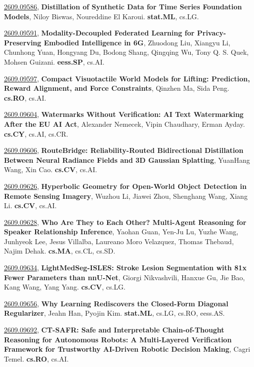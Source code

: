 \documentclass[9pt, a4paper]{article}
\theoremstyle{plain}
\theoremstyle{definition}
\theoremstyle{remark}
\newcommand{\arxivwithtarget}[3]{\hypertarget{#1}{}\href{https://arxiv.org/abs/#1}{#1}, \textbf{\textcolor{arxivblue}{#2}}, #3. }
\begin{document}
\arxivwithtarget{2609.09586}{Distillation of Synthetic Data for Time Series Foundation Models}{Niloy Biswas, Noureddine El Karoui}\textbf{stat.ML}, cs.LG.



\arxivwithtarget{2609.09591}{Modality-Decoupled Federated Learning for Privacy-Preserving Embodied Intelligence in 6G}{Zhuodong Liu, Xiangyu Li, Chunhong Yuan, Hongyang Du, Bodong Shang, Qingqing Wu, Tony Q. S. Quek, Mohsen Guizani}\textbf{eess.SP}, cs.AI.



\arxivwithtarget{2609.09597}{Compact Visuotactile World Models for Lifting: Prediction, Reward Alignment, and Force Constraints}{Qinzhen Ma, Sida Peng}\textbf{cs.RO}, cs.AI.



\arxivwithtarget{2609.09604}{Watermarks Without Verification: AI Text Watermarking After the EU AI Act}{Alexander Nemecek, Vipin Chaudhary, Erman Ayday}\textbf{cs.CY}, cs.AI, cs.CR.



\arxivwithtarget{2609.09606}{RouteBridge: Reliability-Routed Bidirectional Distillation Between Neural Radiance Fields and 3D Gaussian Splatting}{YuanHang Wang, Xin Cao}\textbf{cs.CV}, cs.AI.



\arxivwithtarget{2609.09626}{Hyperbolic Geometry for Open-World Object Detection in Remote Sensing Imagery}{Wuzhou Li, Jiawei Zhou, Shenghang Wang, Xiang Li}\textbf{cs.CV}, cs.AI.



\arxivwithtarget{2609.09628}{Who Are They to Each Other? Multi-Agent Reasoning for Speaker Relationship Inference}{Yaohan Guan, Yen-Ju Lu, Yuzhe Wang, Junhyeok Lee, Jesus Villalba, Laureano Moro Velazquez, Thomas Thebaud, Najim Dehak}\textbf{cs.MA}, cs.CL, cs.SD.



\arxivwithtarget{2609.09634}{LightMedSeg-ISLES: Stroke Lesion Segmentation with 81x Fewer Parameters than nnU-Net}{Giorgi Nikvashvili, Hanxue Gu, Jie Bao, Kang Wang, Yang Yang}\textbf{cs.CV}, cs.LG.



\arxivwithtarget{2609.09656}{Why Learning Rediscovers the Closed-Form Diagonal Regularizer}{Jeahn Han, Pyojin Kim}\textbf{stat.ML}, cs.LG, cs.RO, eess.AS.



\arxivwithtarget{2609.09692}{CT-SAFR: Safe and Interpretable Chain-of-Thought Reasoning for Autonomous Robots: A Multi-Layered Verification Framework for Trustworthy AI-Driven Robotic Decision Making}{Cagri Temel}\textbf{cs.RO}, cs.AI.
\end{document}

